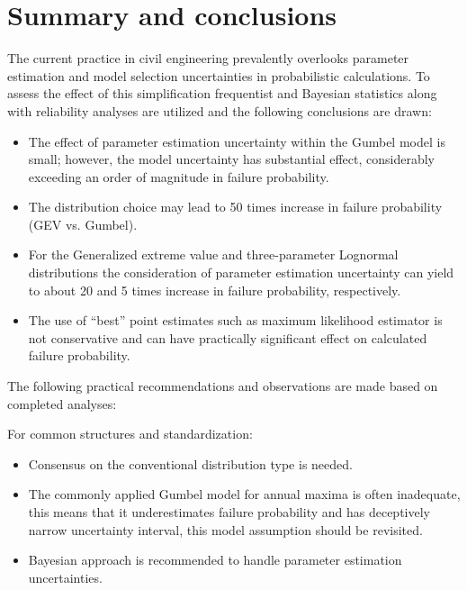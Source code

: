 \section{Summary and conclusions}

The current practice in civil engineering prevalently overlooks parameter estimation and model selection uncertainties in probabilistic calculations. To assess the effect of this simplification frequentist and Bayesian statistics along with reliability analyses are utilized and the following conclusions are drawn:

\begin{itemize}
	\item The effect of parameter estimation uncertainty within the Gumbel model is small; however, the model uncertainty has substantial effect, considerably exceeding an order of magnitude in failure probability.
	\item The distribution choice may lead to 50 times increase in failure probability (GEV vs. Gumbel).
	\item For the Generalized extreme value and three-parameter Lognormal distributions the consideration of parameter estimation uncertainty can yield to about 20 and 5 times increase in failure probability, respectively.
	\item The use of ``best'' point estimates such as maximum likelihood estimator is not conservative and can have practically significant effect on calculated failure probability.
\end{itemize}

The following practical recommendations and observations are made based on completed analyses:

\noindent For common structures and standardization:
\begin{itemize}
	\item Consensus on the conventional distribution type is needed.  
	\item The commonly applied Gumbel model for annual maxima is often inadequate, this means that it underestimates failure probability and has deceptively narrow uncertainty interval, this model assumption should be revisited.  
	\item Bayesian approach is recommended to handle parameter estimation uncertainties.
\end{itemize}

